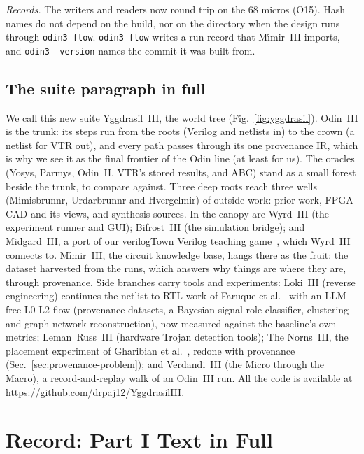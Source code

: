 \documentclass[conference]{IEEEtran}
\newcommand{\code}[1]{\texttt{#1}}
\begin{document}
\emph{Records.} The writers and readers now round trip on the 68 micros (O15). Hash names do not depend on the build, nor on the directory when the design runs through \code{odin3-flow}. \code{odin3-flow} writes a run record that M\'{\i}mir~III imports, and \code{odin3 --version} names the commit it was built from.

\subsection{The suite paragraph in full}

We call this new suite Yggdrasil~III, the world tree (Fig.~\ref{fig:yggdrasil}). Odin~III is the trunk: its steps run from the roots (Verilog and netlists in) to the crown (a netlist for VTR out), and every path passes through its one provenance IR, which is why we see it as the final frontier of the Odin line (at least for us). The oracles (Yosys, Parmys, Odin~II, VTR's stored results, and ABC) stand as a small forest beside the trunk, to compare against. Three deep roots reach three wells (Mimisbrunnr, Urdarbrunnr and Hvergelmir) of outside work: prior work, FPGA CAD and its views, and synthesis sources. In the canopy are Wyrd~III (the experiment runner and GUI); Bifrost~III (the simulation bridge); and Midgard~III, a port of our verilogTown Verilog teaching game~, which Wyrd~III connects to. M\'{\i}mir~III, the circuit knowledge base, hangs there as the fruit: the dataset harvested from the runs, which answers why things are where they are, through provenance. Side branches carry tools and experiments: Loki~III (reverse engineering) continues the netlist-to-RTL work of Faruque et al.~ with an LLM-free L0-L2 flow (provenance datasets, a Bayesian signal-role classifier, clustering and graph-network reconstruction), now measured against the baseline's own metrics; Leman~Russ~III (hardware Trojan detection tools); The Norns~III, the placement experiment of Gharibian et al.~, redone with provenance (Sec.~\ref{sec:provenance-problem}); and Verdandi~III (the Micro through the Macro), a record-and-replay walk of an Odin~III run. All the code is available at \url{https://github.com/drpaj12/YggdrasilIII}.

\section{Record: Part I Text in Full}
\label{sec:moved2}
\end{document}
